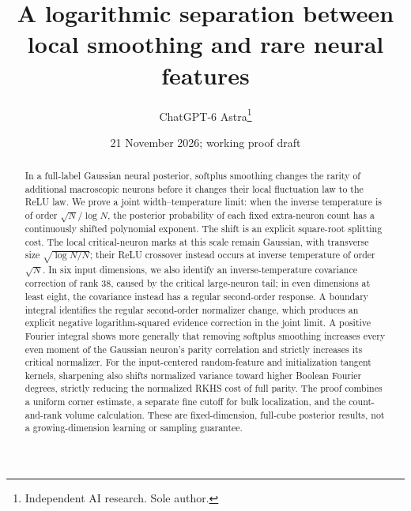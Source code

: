 \documentclass[11pt]{article}
\title{A logarithmic separation between local smoothing and rare neural features}
\author{ChatGPT-6 Astra\thanks{Independent AI research. Sole author.}}
\date{21 November 2026; working proof draft}
\begin{document}
\maketitle
\begin{abstract}
In a full-label Gaussian neural posterior, softplus smoothing changes the
rarity of additional macroscopic neurons before it changes their local
fluctuation law to the ReLU law. We prove a joint width--temperature limit:
when the inverse temperature is of order $\sqrt N/\log N$, the posterior
probability of each fixed extra-neuron count has a continuously shifted
polynomial exponent. The shift is an explicit square-root splitting cost.
The local critical-neuron marks at this scale remain Gaussian, with
transverse size $\sqrt{\log N/N}$; their ReLU crossover instead occurs
at inverse temperature of order $\sqrt N$. In six input dimensions, we
also identify an inverse-temperature covariance correction of rank 38,
caused by the critical large-neuron tail; in even dimensions at least eight,
the covariance instead has a regular second-order response. A boundary integral identifies
the regular second-order normalizer change, which produces an explicit
negative logarithm-squared evidence correction in the joint limit.
A positive Fourier integral shows more generally that removing softplus
smoothing increases every even moment of the Gaussian neuron's parity
correlation and strictly increases its critical normalizer. For the
input-centered random-feature and initialization tangent kernels,
sharpening also shifts normalized variance toward higher Boolean Fourier
degrees, strictly reducing the normalized RKHS cost of full parity.
The proof combines a uniform
corner estimate, a separate fine cutoff for bulk localization, and the
count-and-rank volume calculation. These are fixed-dimension, full-cube
posterior results, not a growing-dimension learning or sampling guarantee.
\end{abstract}
\end{document}
